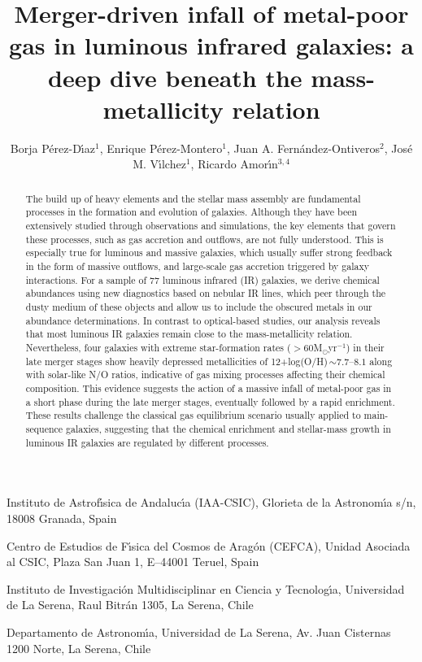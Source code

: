 \documentclass{nature2}
\title{Merger-driven infall of metal-poor gas in luminous infrared galaxies: a deep dive beneath the mass-metallicity relation}
\author{Borja P\'{e}rez-D\'{\i}az$^{1}$, Enrique P\'{e}rez-Montero$^{1}$, Juan A. Fern\'{a}ndez-Ontiveros$^{2}$,
  Jos\'{e} M. V\'{\i}lchez$^{1}$, Ricardo Amor\'{\i}n$^{3, 4}$}
\begin{document}
\maketitle
\begin{affiliations}
\item {\small Instituto de Astrof\'{\i}sica de Andaluc\'{\i}a (IAA-CSIC), Glorieta de la Astronom\'{\i}a s/n, 18008 Granada, Spain}
\item {\small Centro de Estudios de F\'{\i}sica del Cosmos de Arag\'{o}n (CEFCA), Unidad Asociada al CSIC, Plaza San Juan 1, E--44001 Teruel, Spain}
\item {\small Instituto de Investigaci\'{o}n Multidisciplinar en Ciencia y Tecnolog\'{\i}a, Universidad de La Serena, Raul Bitr\'{a}n 1305, La Serena, Chile}
\item {\small Departamento de Astronom\'{\i}a, Universidad de La Serena, Av. Juan Cisternas 1200 Norte, La Serena, Chile}

\end{affiliations}

\begin{abstract}
The build up of heavy elements and the stellar mass assembly are fundamental processes in the formation and evolution of galaxies. Although they have been extensively studied through observations and simulations, the key elements that govern these processes, such as gas accretion and outflows, are not fully understood\cite{Maiolino_Mannucci_2019}. This is especially true for luminous and massive galaxies, which usually suffer strong feedback in the form of massive outflows\cite{Arribas_2014, Cazzoli_2016, Cicone_2014, Pereira-Santaella_2018}, and large-scale gas accretion triggered by galaxy interactions\cite{Joseph_Wright_1985, Howell_2010, Kennicutt_Evans_2012}.
For a sample of 77 luminous infrared (IR) galaxies, we derive chemical abundances using new diagnostics based on nebular IR lines, which peer through the dusty medium of these objects and allow us to include the obscured metals in our abundance determinations. In contrast to optical-based studies, our analysis reveals that most luminous IR galaxies remain close to the mass-metallicity relation. Nevertheless, four galaxies with extreme star-formation rates ($> 60$M\ensuremath{_{\odot }}yr\ensuremath{^{-1}}) in their late merger stages show heavily depressed metallicities of 12+log(O/H)\,$\sim 7.7$--$8.1$ along with solar-like N/O ratios, indicative of gas mixing processes affecting their chemical composition. This evidence suggests the action of a massive infall of metal-poor gas in a short phase during the late merger stages, eventually followed by a rapid enrichment. These results challenge the classical gas equilibrium scenario usually applied to main-sequence galaxies, suggesting that the chemical enrichment and stellar-mass growth in luminous IR galaxies are regulated by different processes.
\end{abstract}
\end{document}
